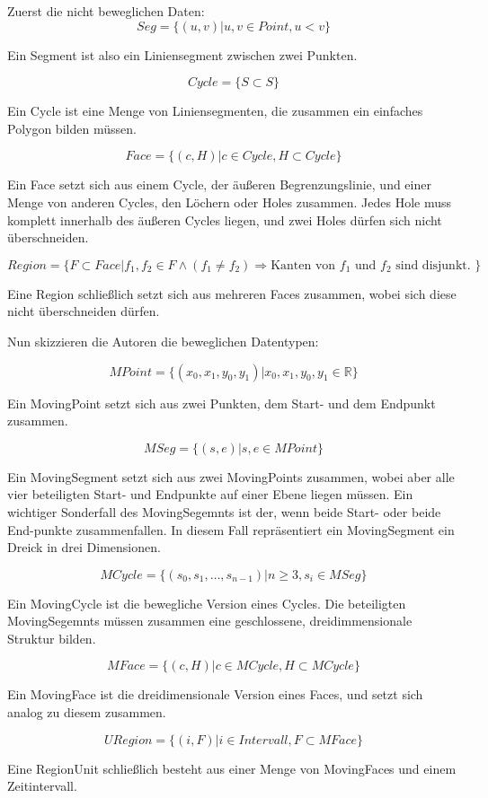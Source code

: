 Zuerst die nicht beweglichen Daten:
$$Seg=\{(u,v)|u,v\in Point, u<v\}$$

Ein Segment ist also ein Liniensegment zwischen zwei Punkten. 

$$Cycle=\{S\subset S\}$$

Ein Cycle ist eine Menge von Liniensegmenten, die zusammen ein einfaches Polygon bilden müssen.

$$Face=\{(c,H)|c\in Cycle, H \subset Cycle\}$$

Ein Face setzt sich aus einem Cycle, der äußeren Begrenzungslinie, und einer Menge von anderen Cycles, den Löchern oder Holes zusammen. Jedes Hole muss komplett innerhalb des äußeren Cycles liegen, und zwei Holes dürfen sich nicht überschneiden. 

$$Region=\{F\subset Face|f_1,f_2\in F \wedge (f_1\neq f_2) \Rightarrow \text{Kanten von }f_1\text{ und } f_2 \text{ sind disjunkt. } \}$$

Eine Region schließlich setzt sich aus mehreren Faces zusammen, wobei sich diese nicht überschneiden dürfen. 

Nun skizzieren die Autoren die beweglichen Datentypen:

$$MPoint=\{(x_0,x_1,y_0,y_1)|x_0,x_1,y_0,y_1\in \mathbb{R}\}$$

Ein MovingPoint setzt sich aus zwei Punkten, dem Start- und dem Endpunkt zusammen.

$$MSeg=\{(s,e)|s,e\in MPoint\}$$

Ein MovingSegment setzt sich aus zwei MovingPoints zusammen, wobei aber alle vier beteiligten Start- und Endpunkte auf einer Ebene liegen müssen. Ein wichtiger Sonderfall des MovingSegemnts ist der, wenn beide Start- oder beide End-punkte zusammenfallen. In diesem Fall repräsentiert ein MovingSegment ein Dreick in drei Dimensionen.

$$MCycle=\{(s_0,s_1,\hdots ,s_{n-1})|n\geq3, s_i\in MSeg\}$$

Ein MovingCycle ist die bewegliche Version eines Cycles. Die beteiligten MovingSegemnts müssen zusammen eine geschlossene, dreidimmensionale Struktur bilden.

$$MFace=\{(c,H)|c\in MCycle, H\subset MCycle\}$$

Ein MovingFace ist die dreidimensionale Version eines Faces, und setzt sich analog zu diesem zusammen.

$$URegion=\{(i,F)|i\in Intervall, F\subset MFace\}$$

Eine RegionUnit schließlich besteht aus einer Menge von MovingFaces und einem Zeitintervall. 

